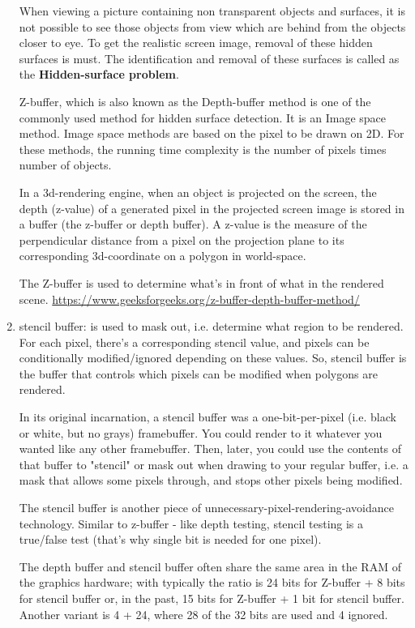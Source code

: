 \begin{enumerate}
When viewing a picture containing non transparent objects and surfaces, it is
not possible to see those objects from view which are behind from the objects
closer to eye. To get the realistic screen image, removal of these hidden
surfaces is must. The identification and removal of these surfaces is called as
the {\bf Hidden-surface problem}.


Z-buffer, which is also known as the Depth-buffer method is one of the commonly
used method for hidden surface detection. It is an Image space method.
Image space methods are based on the pixel to be drawn on 2D. For these methods,
the running time complexity is the number of pixels times number of objects.
 

  
In a 3d-rendering engine, when an object is projected on the screen, the depth
(z-value) of a generated pixel in the projected screen image is stored in a
buffer (the z-buffer or depth buffer). A z-value is the measure of the
perpendicular distance from a pixel on the projection plane to its corresponding
3d-coordinate on a polygon in world-space.

The Z-buffer is used to determine what's in front of what in the
rendered scene. 
\url{https://www.geeksforgeeks.org/z-buffer-depth-buffer-method/}
    
  \item stencil buffer: \label{sec:stencil-bufer} is used to mask out, i.e.
  determine what region to be rendered.
  For each pixel, there's a corresponding stencil value, and pixels can be
  conditionally modified/ignored depending on these values.
  So, stencil buffer is the buffer that controls which pixels can be modified
  when polygons are rendered.
  
  

In its original incarnation, a stencil buffer was a one-bit-per-pixel (i.e.
black or white, but no grays) framebuffer. You could render to it whatever you
wanted like any other framebuffer.
Then, later, you could use the contents of that buffer to "stencil" or mask out
when drawing to your regular buffer, i.e. a mask that allows some pixels
through, and stops other pixels being modified.


The stencil buffer is another piece of unnecessary-pixel-rendering-avoidance
technology.  Similar to z-buffer - like depth testing, stencil testing is a
true/false test (that's why single bit is needed for one pixel).
 

The depth buffer and stencil buffer often share the same area in the
RAM of the graphics hardware; with typically the ratio is 24 bits for Z-buffer +
8 bits for stencil buffer or, in the past, 15 bits for Z-buffer + 1 bit for
stencil buffer. Another variant is 4 + 24, where 28 of the 32 bits are used and 4 ignored.



\end{enumerate}
